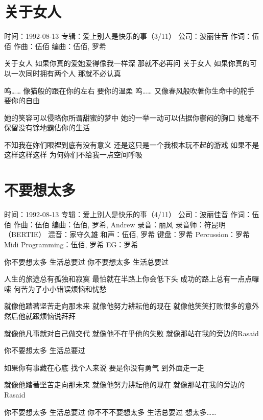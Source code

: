 \documentclass[UTF8,a4paper,oneside,twocolumn,12pt]{ctexbook}
\newcommand{\infopair}[2]{\textbullet #1：#2}
\newcommand{\zc}[1][伍佰]{\infopair{作词}{#1}}
\newcommand{\zq}[1][伍佰]{\infopair{作曲}{#1}}
\newcommand{\bq}[1][伍佰]{\infopair{编曲}{#1}}
\newcommand{\zj}[1]{\infopair{专辑}{#1}}
\newcommand{\sj}[1]{\infopair{时间}{#1}}
\newcommand{\gs}[1]{\infopair{公司}{#1}}
\newenvironment{info}{\begin{flushleft}\kaishu
	}
	{\end{flushleft}\normalsize\yahei\par}
\newenvironment{lyric}{
	}
{}
\begin{document}
\section{关于女人}
\begin{info}
	\sj{1992-08-13}
	\zj{爱上别人是快乐的事（3/11）}
	\gs{波丽佳音}
	\zc
	\zq
	\bq[伍佰, 罗希]
\end{info}
\begin{lyric}
	关于女人
	如果你真的爱她爱得像我一样深
	那就不必再问
	关于女人
	如果你真的可以一次同时拥有两个人
	那就不必认真

	呜……
	像猫般的跟在你的左右
	要你的温柔
	呜……
	又像春风般吹著你生命中的舵手
	要你的自由

	她的笑容可以侵略你所谓甜蜜的梦中
	她的一举一动可以佔据你鬱闷的胸口
	她毫不保留没有馀地霸佔你的生活

	不知我在妳们眼裡到底有没有意义
	还是这只是一个我根本玩不起的游戏
	如果不是这样这样这样 为何妳们不给我一点空间呼吸
\end{lyric}

\section{不要想太多}
\begin{info}
	\sj{1992-08-13}
	\zj{爱上别人是快乐的事（4/11）}
	\gs{波丽佳音}
	\zc
	\zq
	\bq[伍佰, 罗希, Andrew]
	\infopair{录音}{丽风}
	\infopair{录音师}{符昆明（BERTIE）}
	\infopair{混音}{家守久雄}
	\infopair{和声}{伍佰, 罗希}
	\infopair{键盘}{罗希}
	\infopair{Percussion}{罗希}
	\infopair{Midi Programming}{伍佰, 罗希}
	\infopair{EG}{罗希}
\end{info}
\begin{lyric}
	你不要想太多  生活总要过
	你不要想太多  生活总要过

	人生的旅途总有孤独和寂寞
	最怕就在半路上你会低下头
	成功的路上总有一点点囉嗦
	何苦为了小小错误烦恼和忧愁

	就像他踏著坚苦走向那未来
	就像他努力耕耘他的现在
	就像他笑笑打败很多的意外
	然后他就跟烦恼说拜拜

	就像他凡事就对自己做交代
	就像他不在乎他的失败
	就像那站在我的旁边的Rasaid

	你不要想太多  生活总要过

	如果你有事藏在心底  找个人来说
	要是你没有勇气  到外面走一走

	就像他踏著坚苦走向那未来
	就像他努力耕耘他的现在
	就像那站在我的旁边的Rasaid

	你不要想太多  生活总要过
	你不不不要想太多  生活总要过
	想太多……
\end{lyric}
\end{document}
